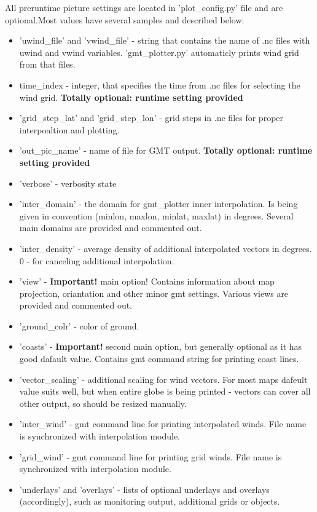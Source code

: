 All preruntime picture settings are located in 'plot\_config.py' file and 
are optional.Most values have several samples and described below:
\begin{itemize}
\item 'uwind\_file' and 'vwind\_file' - string that contains the name of 
 .nc files with uwind and vwind variables. 'gmt\_plotter.py' automaticly
 prints wind grid from that files.
\item time\_index - integer, that specifies the time from .nc files for
 selecting the wind grid.
 \textbf{Totally optional: runtime setting provided}
\item 'grid\_step\_lat' and 'grid\_step\_lon' - grid steps in .nc files for 
 proper interpoaltion and plotting.
\item 'out\_pic\_name' - name of file for GMT output.
 \textbf{Totally optional: runtime setting provided}
\item 'verbose' - verbosity state
\item 'inter\_domain' - the domain for gmt\_plotter inner interpolation.
 Is being given in convention (minlon, maxlon, minlat, maxlat) in degrees.
 Several main domains are provided and commented out.
\item 'inter\_density' - average density of additional interpolated vectors
 in degrees. 0 - for canceling additional interpolation.
\item 'view' - \textbf{Important!} main option! Contains information about
 map projection, oriantation and other minor gmt settings.
 Various views are provided and commented out.
\item 'ground\_colr' - color of ground.
\item 'coasts' - \textbf{Important!} second main option, but generally
 optional as it has good dafault value.
 Contains gmt command string for printing coast lines.
\item 'vector\_scaling' - additional scaling for wind vectors.
 For most maps dafeult value suits well, but when entire globe is being 
 printed - vectors can cover all other output, so should be resized 
 manually.
\item 'inter\_wind' - gmt command line for printing interpolated winds. File
 name is synchronized with interpolation module.
\item 'grid\_wind' - gmt command line for printing grid winds. File
 name is synchronized with interpolation module.
\item 'underlays' and 'overlays' - lists of optional underlays and overlays
 (accordingly), such as monitoring output, additional grids or objects.
\end{itemize}

